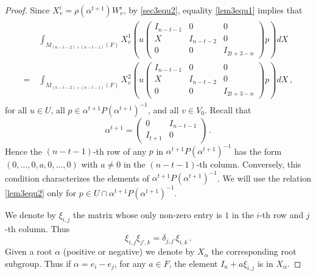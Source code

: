 \documentclass[12pt]{amsart}
\begin{document}
\begin{proof}
Since $X_v^i= \rho(\alpha^{t+1}) W^i_{v}$, by \eqref{sec3equ2}, 
equality \eqref{lem3equ1} implies that 
\begin{align}\label{lem3equ2}
\begin{split}
& \int_{M_{(n-t-2) \times (n-t-1)}(F)} X^1_v \left(u \begin{pmatrix}
I_{n-t-1} & 0 & 0\\
X & I_{n-t-2} & 0\\
0 & 0 & I_{2t+3-n}
\end{pmatrix} p\right) dX \\
= \ & \int_{M_{(n-t-2) \times (n-t-1)}(F)} X^2_v \left(u \begin{pmatrix}
I_{n-t-1} & 0 & 0\\
X & I_{n-t-2} & 0\\
0 & 0 & I_{2t+3-n}
\end{pmatrix} p\right) dX\,,
\end{split}
\end{align} 
for all $u \in U$, all $p \in \alpha^{t+1} P (\alpha^{t+1})^{-1}$, and all $v \in V_0$. 
Recall that 
$$\alpha^{t+1} = \begin{pmatrix}
0 & I_{n-t-1}\\
I_{t+1} & 0
\end{pmatrix}\,.$$
Hence the $(n-t-1)$-th row of any $p$ in $\alpha^{t+1} P (\alpha^{t+1})^{-1}$ has the form $(0, \dots, 0, a, 0, \ldots, 0)$ with $a \neq 0$ in the $(n-t-1)$-th column. 
Conversely, this condition characterizes the elements of 
$\alpha^{t+1} P (\alpha^{t+1})^{-1}$.
We will use the relation \eqref{lem3equ2} only for  $p\in U\cap \alpha^{t+1} P (\alpha^{t+1})^{-1}$. 

We denote by $\xi_{i,j}$ the matrix whose only non-zero entry 
is $1$ in the $i$-th row and $j$-th column. Thus
\[ \xi_{i,j} \xi_{j',k}= \delta _{j,j'} \xi_{i,k} \,.\]
Given a root $\alpha$ (positive or negative) we denote by $X_\alpha$ the corresponding root subgroup. Thus if $\alpha=e_i-e_j$, for any $a\in F$, the element $I_n+ a \xi_{i,j}$ is in $X_\alpha$.


\end{proof}
\end{document}
